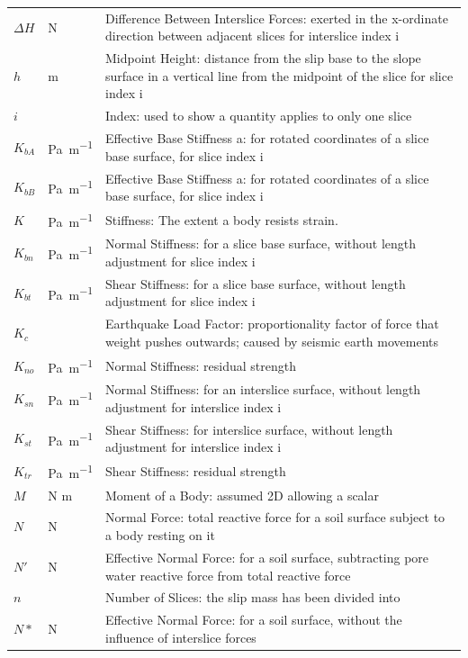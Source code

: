 \documentclass[12pt]{article}
\begin{document}
\begin{longtable}{  l  l  p{8.5cm}  }
$\Delta{}H$ & \si{\newton} & Difference Between Interslice Forces: exerted in the x-ordinate direction between adjacent slices for interslice index i
\\
$h$ &  \si{\meter}&Midpoint Height: distance from the slip base to the slope surface in a vertical line from the midpoint of the slice for slice index i
\\
$i$ & & Index: used to show a quantity applies to only one slice 
\\
${K_{bA}}$ &\si{\pascal\per\meter} & Effective Base Stiffness a: for rotated coordinates of a slice base surface, for slice index i
\\
${K_{bB}}$ &\si{\pascal\per\meter} & Effective Base Stiffness a: for rotated coordinates of a slice base surface, for slice index i
\\
$K$ &  \si{\pascal\per\meter} &Stiffness: The extent a body resists strain.
\\
${K_{bn}}$ & \si{\pascal\per\meter} & Normal Stiffness: for a slice base surface, without length adjustment for slice index i
\\
${K_{bt}}$ & \si{\pascal\per\meter} & Shear Stiffness: for a slice base surface, without length adjustment for slice index i
\\
${K_{c}}$ & & Earthquake Load Factor: proportionality factor of force that weight pushes outwards; caused by seismic earth movements 
\\
${K_{no}}$ &\si{\pascal\per\meter} & Normal Stiffness: residual strength
\\
${K_{sn}}$ &\si{\pascal\per\meter} & Normal Stiffness: for an interslice surface, without length adjustment for interslice index i
\\
${K_{st}}$ & \si{\pascal\per\meter} & Shear Stiffness: for interslice surface, without length adjustment for interslice index i
\\
${K_{tr}}$ &\si{\pascal\per\meter} & Shear Stiffness: residual strength
\\
$M$ & N  \si{\meter}& Moment of a Body: assumed 2D allowing a scalar
\\
$N$ & \si{\newton} & Normal Force: total reactive force for a soil surface subject to a body resting on it
\\
$N'$ &\si{\newton} & Effective Normal Force: for a soil surface, subtracting pore water reactive force from total reactive force 
\\
$n$ & & Number of Slices: the slip mass has been divided into  
\\
$N*$ &\si{\newton} & Effective Normal Force: for a soil surface, without the influence of interslice forces

\end{longtable}
\end{document}
